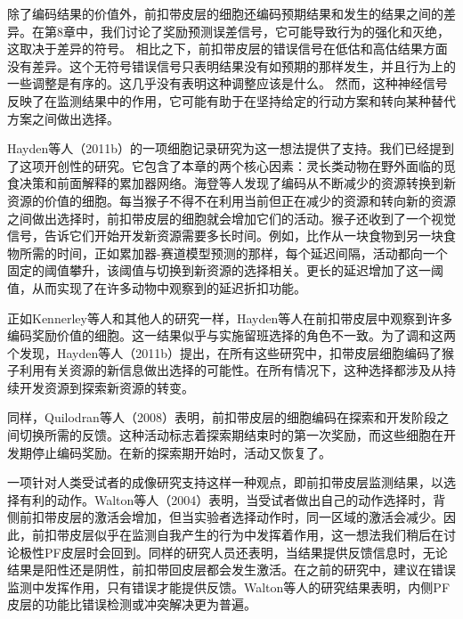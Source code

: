 除了编码结果的价值外，前扣带皮层的细胞还编码预期结果和发生的结果之间的差异。在第8章中，我们讨论了奖励预测误差信号，它可能导致行为的强化和灭绝，这取决于差异的符号。
相比之下，前扣带皮层的错误信号在低估和高估结果方面没有差异\cite{Hayden et al,2011a}。这个无符号错误信号只表明结果没有如预期的那样发生，并且行为上的一些调整是有序的。这几乎没有表明这种调整应该是什么。
然而，这种神经信号反映了在监测结果中的作用，它可能有助于在坚持给定的行动方案和转向某种替代方案之间做出选择。\par
Hayden等人（2011b）的一项细胞记录研究为这一想法提供了支持。我们已经提到了这项开创性的研究。它包含了本章的两个核心因素：灵长类动物在野外面临的觅食决策和前面解释的累加器网络。海登等人发现了编码从不断减少的资源转换到新资源的价值的细胞。每当猴子不得不在利用当前但正在减少的资源和转向新的资源之间做出选择时，前扣带皮层的细胞就会增加它们的活动。猴子还收到了一个视觉信号，告诉它们开始开发新资源需要多长时间。例如，比作从一块食物到另一块食物所需的时间，正如累加器-赛道模型预测的那样，每个延迟间隔，活动都向一个固定的阈值攀升，该阈值与切换到新资源的选择相关。更长的延迟增加了这一阈值，从而实现了在许多动物中观察到的延迟折扣功能。\par
正如Kennerley等人和其他人的研究一样\cite{Matsumoto et al 2003;Seo & Lee 2007}，Hayden等人在前扣带皮层中观察到许多编码奖励价值的细胞\cite{Hayden et al 2009;Hayden&Platt 2010}。这一结果似乎与实施留班选择的角色不一致。为了调和这两个发现，Hayden等人（2011b）提出，在所有这些研究中，扣带皮层细胞编码了猴子利用有关资源的新信息做出选择的可能性。在所有情况下，这种选择都涉及从持续开发资源到探索新资源的转变。\par
同样，Quilodran等人（2008）表明，前扣带皮层的细胞编码在探索和开发阶段之间切换所需的反馈。这种活动标志着探索期结束时的第一次奖励，而这些细胞在开发期停止编码奖励。在新的探索期开始时，活动又恢复了。\par
一项针对人类受试者的成像研究支持这样一种观点，即前扣带皮层监测结果，以选择有利的动作。Walton等人（2004）表明，当受试者做出自己的动作选择时，背侧前扣带皮层的激活会增加，但当实验者选择动作时，同一区域的激活会减少。因此，前扣带皮层似乎在监测自我产生的行为中发挥着作用，这一想法我们稍后在讨论极性PF皮层时会回到。同样的研究人员还表明，当结果提供反馈信息时，无论结果是阳性还是阴性，前扣带回皮层都会发生激活。在之前的研究中，建议在错误监测中发挥作用，只有错误才能提供反馈\cite{Yeung et al,2004}。Walton等人的研究结果表明，内侧PF皮层的功能比错误检测或冲突解决更为普遍。\par
